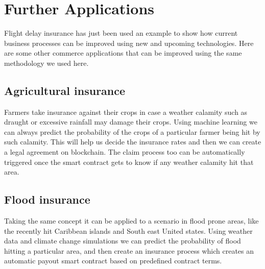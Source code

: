 \section{Further Applications}
Flight delay insurance has just been used an example to show how current business processes can be improved using new and upcoming technologies. Here are some other commerce applications that can be improved using the same methodology we used here.

\subsection{Agricultural insurance}
Farmers take insurance against their crops in case a weather calamity such as draught or excessive rainfall may damage their crops. Using machine learning we can always predict the probability of the crops of a particular farmer being hit by such calamity. This will help us decide the insurance rates and then we can create a legal agreement on blockchain. The claim process too can be automatically triggered once the smart contract gets to know if any weather calamity hit that area.

\subsection{Flood insurance}
Taking the same concept it can be applied to a scenario in flood prone areas, like the recently hit Caribbean islands and South east United states. Using weather data and climate change simulations we can predict the probability of flood hitting a particular area, and then create an insurance process which creates an automatic payout smart contract based on predefined contract terms.